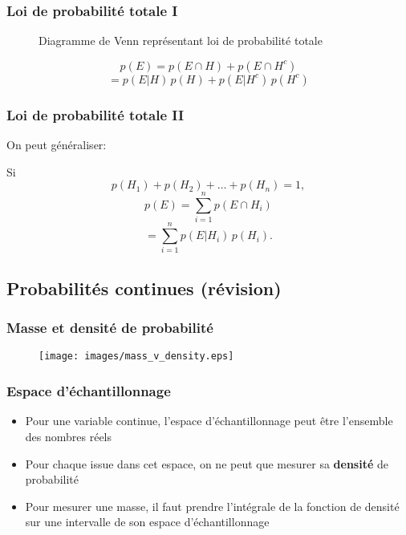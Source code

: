 \documentclass{beamer}
\begin{document}
\begin{frame}
    \frametitle{Loi de probabilité totale I}
    \begin{figure}
      \centering
      
      \caption{Diagramme de Venn représentant loi de probabilité totale}
    \end{figure}
    \pause
    \[p(E) = p(E \cap H) + p(E \cap H^c)\]
    \[ = p(E | H) \, p(H) + p(E | H^c) \, p(H^c)\]
\end{frame}


\begin{frame}
    \frametitle{Loi de probabilité totale II}
    On peut généraliser:

    \pause

    \vfill

    Si 
    \[p(H_1) + p(H_2) + \ldots + p(H_n) = 1,\]
    \pause
    \[p(E) = \sum_{i=1}^{n} p(E \cap H_i)\]
    \pause
    \[= \sum_{i=1}^{n} p(E | H_i) \, p(H_i).\]
\end{frame}



\subsection{Probabilités continues (révision)}

\begin{frame}
    \frametitle{Masse et densité de probabilité}
    \begin{figure}
      \centering
      \texttt{[image: images/mass\_v\_density.eps]}
    \end{figure}
\end{frame}


\begin{frame}
    \frametitle{Espace d'échantillonnage}
    \begin{itemize}
      \item Pour une variable continue, l'espace d'échantillonnage peut être l'ensemble des nombres réels
      \pause
      \item Pour chaque issue dans cet espace, on ne peut que mesurer sa \textbf{densité} de probabilité
      \pause
      \item Pour mesurer une masse, il faut prendre l'intégrale de la fonction
            de densité sur une intervalle de son espace d'échantillonnage
    \end{itemize}
\end{frame}
\end{document}
